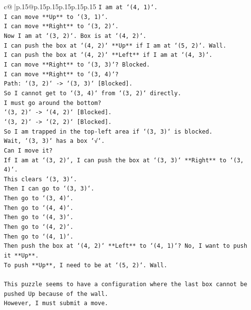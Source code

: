 \documentclass{article}
\begin{document}
{\begin{supertabular}{c@{$\;$}|p{.15\linewidth}@{}p{.15\linewidth}p{.15\linewidth}p{.15\linewidth}p{.15\linewidth}p{.15\linewidth}}
{{{\texttt{I am at `(4, 1)`.} \\
\texttt{I can move **Up** to `(3, 1)`.} \\
\texttt{I can move **Right** to `(3, 2)`.} \\
\texttt{Now I am at `(3, 2)`. Box is at `(4, 2)`.} \\
\texttt{I can push the box at `(4, 2)` **Up** if I am at `(5, 2)`. Wall.} \\
\texttt{I can push the box at `(4, 2)` **Left** if I am at `(4, 3)`.} \\
\texttt{I can move **Right** to `(3, 3)`? Blocked.} \\
\texttt{I can move **Right** to `(3, 4)`?} \\
\texttt{Path: `(3, 2)` {-}> `(3, 3)` {[}Blocked{]}.} \\
\texttt{So I cannot get to `(3, 4)` from `(3, 2)` directly.} \\
\texttt{I must go around the bottom?} \\
\texttt{`(3, 2)` {-}> `(4, 2)` {[}Blocked{]}.} \\
\texttt{`(3, 2)` {-}> `(2, 2)` {[}Blocked{]}.} \\
\texttt{So I am trapped in the top{-}left area if `(3, 3)` is blocked.} \\
\texttt{Wait, `(3, 3)` has a box `√`.} \\
\texttt{Can I move it?} \\
\texttt{If I am at `(3, 2)`, I can push the box at `(3, 3)` **Right** to `(3, 4)`.} \\
\texttt{This clears `(3, 3)`.} \\
\texttt{Then I can go to `(3, 3)`.} \\
\texttt{Then go to `(3, 4)`.} \\
\texttt{Then go to `(4, 4)`.} \\
\texttt{Then go to `(4, 3)`.} \\
\texttt{Then go to `(4, 2)`.} \\
\texttt{Then go to `(4, 1)`.} \\
\texttt{Then push the box at `(4, 2)` **Left** to `(4, 1)`? No, I want to push it **Up**.} \\
\texttt{To push **Up**, I need to be at `(5, 2)`. Wall.} \\
\\ 
\texttt{This puzzle seems to have a configuration where the last box cannot be pushed Up because of the wall.} \\
\texttt{However, I must submit a move.} \\
}}}
\end{supertabular}}
\end{document}
